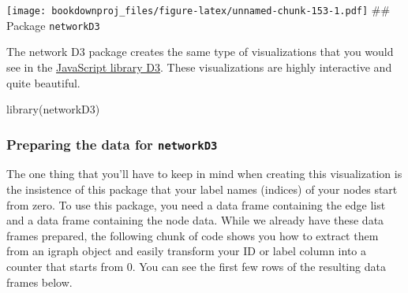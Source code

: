 \documentclass[
]{article}
\newenvironment{Shaded}{\begin{snugshade}}{\end{snugshade}}
\newcommand{\FunctionTok}[1]{\textcolor[rgb]{0.00,0.00,0.00}{#1}}
\newcommand{\NormalTok}[1]{#1}
\theoremstyle{definition}
\theoremstyle{definition}
\theoremstyle{definition}
\theoremstyle{definition}
\theoremstyle{remark}
\begin{document}
\texttt{[image: bookdownproj\_files/figure-latex/unnamed-chunk-153-1.pdf]}
\#\# Package \texttt{networkD3}

The network D3 package creates the same type of visualizations that you would see in the \href{https://d3js.org}{JavaScript library D3}. These visualizations are highly interactive and quite beautiful.

\begin{Shaded}
\begin{Highlighting}[]
\FunctionTok{library}\NormalTok{(networkD3)}
\end{Highlighting}
\end{Shaded}

\hypertarget{preparing-the-data-for-networkd3}{%
\subsubsection{\texorpdfstring{Preparing the data for \texttt{networkD3}}{Preparing the data for networkD3}}\label{preparing-the-data-for-networkd3}}

The one thing that you'll have to keep in mind when creating this visualization is the insistence of this package that your label names (indices) of your nodes start from zero. To use this package, you need a data frame containing the edge list and a data frame containing the node data. While we already have these data frames prepared, the following chunk of code shows you how to extract them from an igraph object and easily transform your ID or label column into a counter that starts from 0. You can see the first few rows of the resulting data frames below.
\end{document}
